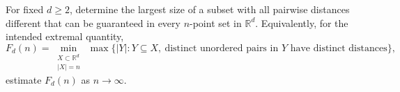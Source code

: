 For fixed $d\geq2$, determine the largest size of a subset with all pairwise distances different that can be guaranteed in every $n$-point set in $\mathbb R^d$. Equivalently, for the intended extremal quantity,
\[F_d(n)=\min_{\substack{X\subset\mathbb R^d\\|X|=n}}\ \max\{|Y|:Y\subseteq X,\ \text{distinct unordered pairs in }Y\text{ have distinct distances}\},\]
estimate $F_d(n)$ as $n\to\infty$.
